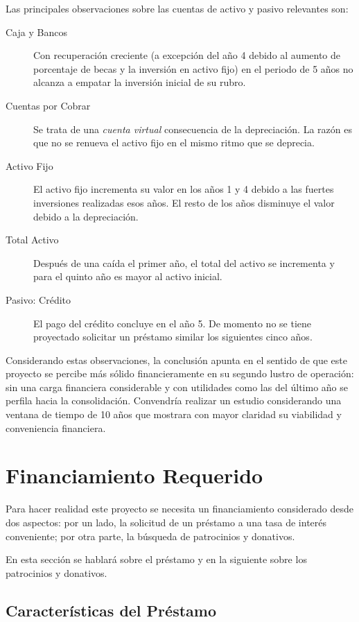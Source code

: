 Las principales observaciones sobre las cuentas de activo y pasivo relevantes son:

\begin{description}
	\item[Caja y Bancos] Con recuperación creciente (a excepción del año 4 debido al aumento de porcentaje de becas y la inversión en activo fijo) en el periodo de 5 años no alcanza a empatar la inversión inicial de su rubro.
	\item[Cuentas por Cobrar] Se trata de una \emph{cuenta virtual} consecuencia de la depreciación. La razón es que no se renueva el activo fijo en el mismo ritmo que se deprecia.
	\item[Activo Fijo] El activo fijo incrementa su valor en los años 1 y 4 debido a las fuertes inversiones realizadas esos años. El resto de los años disminuye el valor debido a la depreciación.
	\item[Total Activo] Después de una caída el primer año, el total del activo se incrementa y para el quinto año es mayor al activo inicial.
	\item[Pasivo: Crédito] El pago del crédito concluye en el año 5. De momento no se tiene proyectado solicitar un préstamo similar los siguientes cinco años.
\end{description}

Considerando estas observaciones, la conclusión apunta en el sentido de que este proyecto se percibe más sólido financieramente en su segundo lustro de operación: sin una carga financiera considerable y con utilidades como las del último año se perfila hacia la consolidación. Convendría realizar un estudio considerando una ventana de tiempo de 10 años que mostrara con mayor claridad su viabilidad y conveniencia financiera.



\section{Financiamiento Requerido}
\label{sec:Financiamiento}

Para hacer realidad este proyecto se necesita un financiamiento considerado desde dos aspectos: por un lado, la solicitud de un préstamo a una tasa de interés conveniente; por otra parte, la búsqueda de patrocinios y donativos.

En esta sección se hablará sobre el préstamo y en la siguiente sobre los patrocinios y donativos.

\subsection{Características del Préstamo}

